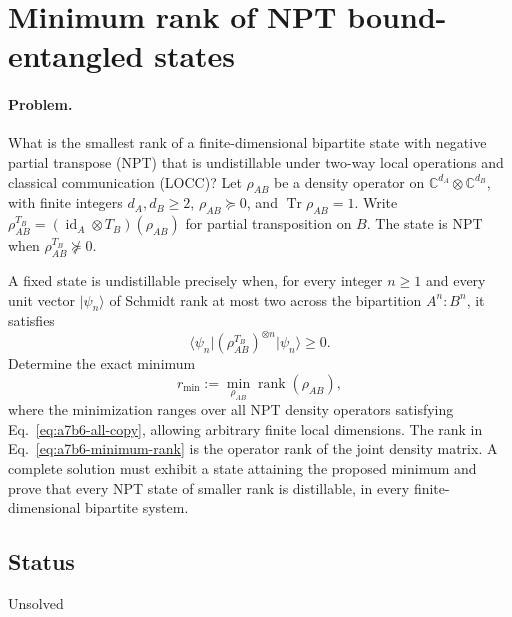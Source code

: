 \section{Minimum rank of NPT bound-entangled states}
\label{sec:op_8418fbac4739a7b6}

\paragraph{Problem.}
What is the smallest rank of a finite-dimensional bipartite state with negative
partial transpose (NPT) that is undistillable under two-way local operations and classical communication
(LOCC)? Let $\rho_{AB}$ be a density operator on
$\mathbb C^{d_A}\otimes\mathbb C^{d_B}$, with finite integers $d_A,d_B\geq2$,
$\rho_{AB}\succeq0$, and $\operatorname{Tr}\rho_{AB}=1$.
Write $\rho_{AB}^{T_B}=(\operatorname{id}_A\otimes T_B)(\rho_{AB})$ for
partial transposition on $B$. The state is NPT when
$\rho_{AB}^{T_B}\not\succeq0$.

A fixed state is undistillable precisely when, for every integer $n\geq1$
and every unit vector $\lvert\psi_n\rangle$ of Schmidt rank at most two
across the bipartition $A^n:B^n$, it satisfies
\begin{equation}
  \langle\psi_n\rvert(\rho_{AB}^{T_B})^{\otimes n}\lvert\psi_n\rangle\geq0.
  \label{eq:a7b6-all-copy}
\end{equation}
Determine the exact minimum
\begin{equation}
  r_{\min}:=\min_{\rho_{AB}}\operatorname{rank}(\rho_{AB}),
  \label{eq:a7b6-minimum-rank}
\end{equation}
where the minimization ranges over all NPT density operators satisfying
Eq.~\eqref{eq:a7b6-all-copy}, allowing arbitrary finite local dimensions.
The rank in Eq.~\eqref{eq:a7b6-minimum-rank} is the operator rank of the
joint density matrix. A complete solution must exhibit a state attaining
the proposed minimum and prove that every NPT state of smaller rank is
distillable, in every finite-dimensional bipartite system.

\subsection*{Status}

Unsolved

